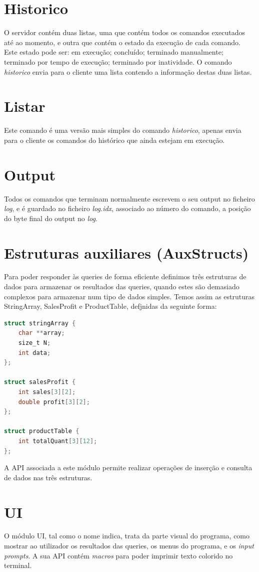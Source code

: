 \documentclass[a4paper]{report}
\begin{document}
	\section{Historico}
	O servidor contém duas listas, uma que contém todos os comandos executados até ao momento, e outra que contém o estado da execução de cada comando. Este estado pode ser: em execução; concluído; terminado manualmente; terminado por tempo de execução; terminado por inatividade. O comando \emph{historico} envia para o cliente uma lista contendo a informação destas duas listas.
	
	\section{Listar}
	Este comando é uma versão mais simples do comando \emph{historico}, apenas envia para o cliente os comandos do histórico que ainda estejam em execução.
	
	\section{Output}
	Todos os comandos que terminam normalmente escrevem o seu output no ficheiro \emph{log}, e é guardado no ficheiro \emph{log.idx}, associado ao número do comando, a posição do byte final do output no \emph{log}.
	
	\section{Estruturas auxiliares (AuxStructs)}
	Para poder responder às queries de forma eficiente definimos três estruturas de dados para armazenar os resultados das queries, quando estes são demasiado complexos para armazenar num tipo de dados simples. Temos assim as estruturas StringArray, SalesProfit e ProductTable, defjnidas da seguinte forma:
	\begin{lstlisting}[language=C]
struct stringArray {
	char **array;
	size_t N;
	int data;
};

struct salesProfit {
	int sales[3][2];
	double profit[3][2];
};

struct productTable {
	int totalQuant[3][12];
};
	\end{lstlisting}
	A API associada a este módulo permite realizar operações de inserção e consulta de dados nas três estruturas.
		
	\section{UI}
	O módulo UI, tal como o nome indica, trata da parte visual do programa, como mostrar ao utilizador os resultados das queries, os menus do programa, e os \textit{input prompts}. A sua API contém \textit{macros} para poder imprimir texto colorido no terminal.
	
\end{document}
